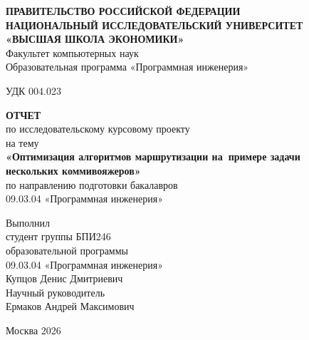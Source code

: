 \documentclass[a4paper,14pt]{extreport}
\begin{document}
\begin{titlepage}
\thispagestyle{empty}
\begin{center}
\textbf{ПРАВИТЕЛЬСТВО РОССИЙСКОЙ ФЕДЕРАЦИИ}\\
\textbf{НАЦИОНАЛЬНЫЙ ИССЛЕДОВАТЕЛЬСКИЙ УНИВЕРСИТЕТ}\\
\textbf{«ВЫСШАЯ ШКОЛА ЭКОНОМИКИ»}\\[4pt]
Факультет компьютерных наук\\
Образовательная программа «Программная инженерия»
\end{center}

\vspace{1em}
\begin{center}
УДК 004.023
\end{center}

\vspace{2em}
\begin{center}
\textbf{ОТЧЕТ}\\[2pt]
по исследовательскому курсовому проекту\\[14pt]

на тему\\
\textbf{«Оптимизация алгоритмов маршрутизации на~примере задачи\\
нескольких коммивояжеров»}\\[14pt]

по направлению подготовки бакалавров\\
09.03.04 «Программная инженерия»
\end{center}

\vspace{3em}
\begin{flushright}
\begin{minipage}{8cm}
Выполнил\\
студент группы БПИ246\\
образовательной программы\\
09.03.04 «Программная инженерия»\\[6pt]
Купцов Денис Дмитриевич\\[18pt]
Научный руководитель\\
Ермаков Андрей Максимович
\end{minipage}
\end{flushright}

\vfill
\begin{center}
Москва 2026
\end{center}
\end{titlepage}
\end{document}
